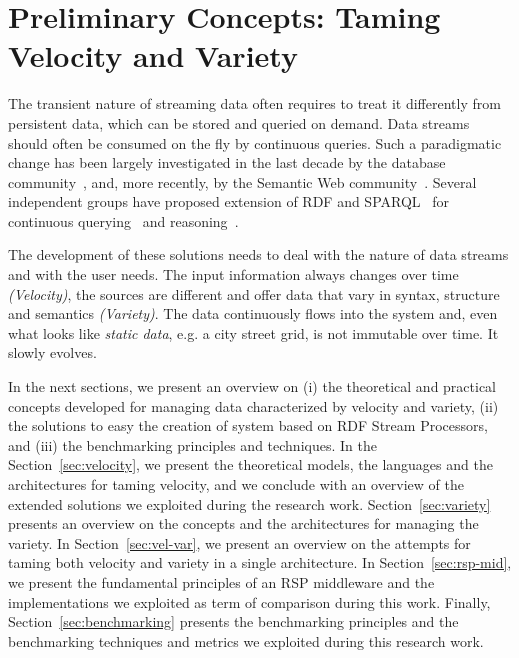\chapter{Preliminary Concepts: Taming Velocity and Variety}\label{ch:background}

The transient nature of streaming data often requires to treat it differently from persistent data, which can be stored and queried on demand. Data streams should often be consumed on the fly by continuous queries. Such a paradigmatic change has been largely investigated in the last decade by the database community~\cite{garofalakis2016data}, and, more recently, by the Semantic Web community~\cite{della2009s}. Several independent groups have proposed extension of RDF and SPARQL~\cite{w3c_sparql} for continuous querying~\cite{Barbieri2010b,DBLP:conf/semweb/PhuocDPH11,DBLP:conf/semweb/CalbimonteCG10} and reasoning~\cite{DBLP:journals/ijsc/BarbieriBCVG10,Anicic2011}. 

\sloppy The development of these solutions needs to deal with the nature of data streams and with the user needs. 
The input information always changes over time \textit{(Velocity)}, the sources are different and offer data that vary in syntax, structure and semantics \textit{(Variety)}. The data continuously flows into the system and, even what looks like \textit{static data}, e.g. a city street grid, is not immutable over time. It slowly evolves.

In the next sections, we present an overview on (i) the theoretical and practical concepts developed for managing data characterized by velocity and variety, (ii) the solutions to easy the creation of system based on RDF Stream Processors, and (iii) the benchmarking principles and techniques.
In the Section~\ref{sec:velocity}, we present the theoretical models, the languages and the architectures for taming velocity, and we conclude with an overview of the extended solutions we exploited during the research work. Section~\ref{sec:variety} presents an overview on the concepts and the architectures for managing the variety.
In Section~\ref{sec:vel-var}, we present an overview on the attempts for taming both velocity and variety in a single architecture.
In Section~\ref{sec:rsp-mid}, we present the fundamental principles of an RSP middleware and the implementations we exploited as term of comparison during this work.
Finally, Section~\ref{sec:benchmarking} presents the benchmarking principles and the benchmarking techniques and metrics we exploited during this research work.


